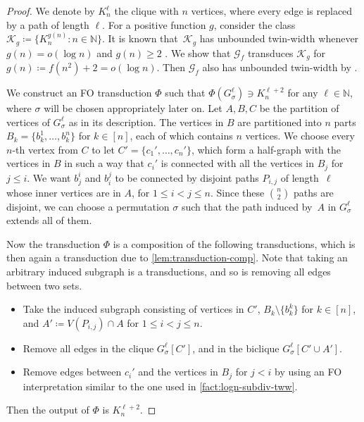 \documentclass[a4paper,UKenglish,cleveref,thm-restate]{lipics-v2021}
\theoremstyle{remark}
\newcommand{\Gc}{\mathcal{G}}
\newcommand{\Kc}{\mathcal{K}}
\newcommand{\N}{\mathbb{N}}
\begin{document}
\begin{proof}
    We denote by $K_n^{\ell}$ the clique with $n$ vertices, where every edge is replaced by a path of length $\ell$. For a positive function $g$, consider the class $\Kc_g \coloneqq \{K_n^{g(n)} : n \in \N\}$. It is known that~$\Kc_g$ has unbounded twin-width whenever $g(n) = o(\log n)$ and $g(n) \ge 2$ \cite[Theorem~6.2]{twin-width2}. We show that $\Gc_f$ transduces $\Kc_g$ for $g(n) \coloneqq f(n^2) + 2 = o(\log n)$. Then $\Gc_f$ also has unbounded twin-width by \cite[Theorem~8.1]{Bonnet2022twinwidth1}.

    We construct an FO transduction $\Phi$ such that $\Phi(G_\sigma^\ell) \ni K_n^{\ell+2}$ for any $\ell \in \N$, where $\sigma$ will be chosen appropriately later on. Let $A, B, C$ be the partition of vertices of $G_\sigma^\ell$ as in its description. The vertices in $B$ are partitioned into $n$ parts $B_k = \{b_k^1, \dots, b_k^n\}$ for $k \in [n]$, each of which contains $n$ vertices. We choose every $n$-th vertex from $C$ to let $C' = \{c_1', \dots, c_n'\}$, which form a half-graph with the vertices in $B$ in such a way that $c_i'$ is connected with all the vertices in $B_j$ for $j \leq i$. 
    We want $b_j^i$ and $b_i^j$ to be connected by disjoint paths $P_{i,j}$ of length~$\ell$ whose inner vertices are in $A$, for $1 \leq i < j \leq n$.
    Since these $\binom{n}{2}$ paths are disjoint, we can choose a permutation $\sigma$ such that the path induced by~$A$ in $G_\sigma^\ell$ extends all of them.
    
    
    Now the transduction $\Phi$ is a composition of the following transductions, which is then again a transduction due to \cref{lem:transduction-comp}.
    Note that taking an arbitrary induced subgraph is a transductions, and so is removing all edges between two sets.
    \begin{itemize}
        \item Take the induced subgraph consisting of vertices in $C'$, $B_k \setminus \{b_k^k\}$ for $k \in [n]$, and $A' \coloneqq V(P_{i,j}) \cap A$ for $1 \leq i < j \leq n$.
        \item Remove all edges in the clique $G_\sigma^\ell[C']$, and in the biclique $G_\sigma^\ell[C' \cup A']$.
        \item Remove edges between $c_i'$ and the vertices in $B_j$ for $j < i$ by using an FO interpretation similar to the one used in \cref{fact:logn-subdiv-tww}.
    \end{itemize}
    Then the output of $\Phi$ is $K_n^{\ell+2}$.
\end{proof}
\end{document}
